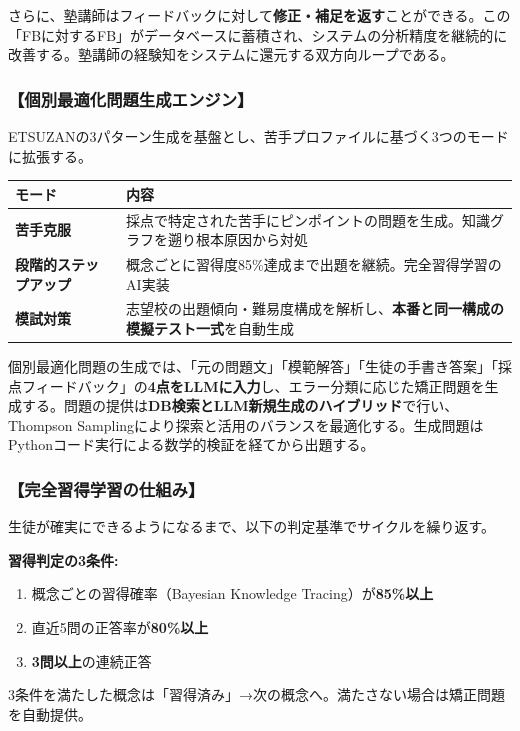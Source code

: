 \documentclass[paper=a4,fontsize=10.5bp,jafontsize=10.5bp,twocolumn]{jlreq}
\begin{document}
さらに、塾講師はフィードバックに対して\textbf{修正・補足を返す}ことができる。この「FBに対するFB」がデータベースに蓄積され、システムの分析精度を継続的に改善する。塾講師の経験知をシステムに還元する双方向ループである。

\subsubsection{【個別最適化問題生成エンジン】}

ETSUZANの3パターン生成を基盤とし、苦手プロファイルに基づく3つのモードに拡張する。


\begin{footnotesize}\noindent
\begin{tabularx}{\linewidth}{>{\bfseries}l X}
\toprule
モード & 内容 \\
\midrule
苦手克服 & 採点で特定された苦手にピンポイントの問題を生成。知識グラフを遡り根本原因から対処 \\
段階的ステップアップ & 概念ごとに習得度85\%達成まで出題を継続。完全習得学習のAI実装 \\
模試対策 & 志望校の出題傾向・難易度構成を解析し、\textbf{本番と同一構成の模擬テスト一式}を自動生成 \\
\bottomrule
\end{tabularx}
\end{footnotesize}


個別最適化問題の生成では、「元の問題文」「模範解答」「生徒の手書き答案」「採点フィードバック」の\textbf{4点をLLMに入力}し、エラー分類に応じた矯正問題を生成する。問題の提供は\textbf{DB検索とLLM新規生成のハイブリッド}で行い、Thompson Samplingにより探索と活用のバランスを最適化する。生成問題はPythonコード実行による数学的検証を経てから出題する。

\subsubsection{【完全習得学習の仕組み】}

生徒が確実にできるようになるまで、以下の判定基準でサイクルを繰り返す。

\begin{graybox}
\textbf{習得判定の3条件:}
\begin{enumerate}[leftmargin=2em]
  \item 概念ごとの習得確率（Bayesian Knowledge Tracing）が\textbf{85\%以上}
  \item 直近5問の正答率が\textbf{80\%以上}
  \item \textbf{3問以上}の連続正答
\end{enumerate}
3条件を満たした概念は「習得済み」→次の概念へ。満たさない場合は矯正問題を自動提供。
\end{graybox}
\end{document}
